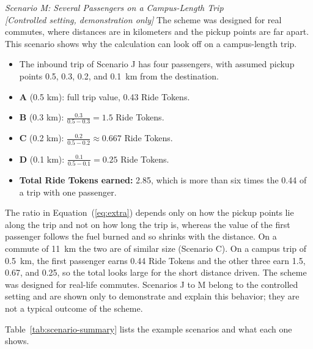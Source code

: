 \vspace{1em}
\noindent\textit{Scenario M: Several Passengers on a Campus-Length Trip}\\\textit{[Controlled setting, demonstration only]}
The scheme was designed for real commutes, where distances are in kilometers and the pickup points are far apart. This scenario shows why the calculation can look off on a campus-length trip.
\begin{itemize}
    \item The inbound trip of Scenario J has four passengers, with assumed pickup points 0.5, 0.3, 0.2, and 0.1~km from the destination.
    \item \textbf{A} (0.5 km): full trip value, 0.43 Ride Tokens.
    \item \textbf{B} (0.3 km): $\frac{0.3}{0.5-0.3} = 1.5$ Ride Tokens.
    \item \textbf{C} (0.2 km): $\frac{0.2}{0.5-0.2} \approx 0.667$ Ride Tokens.
    \item \textbf{D} (0.1 km): $\frac{0.1}{0.5-0.1} = 0.25$ Ride Tokens.
    \item \textbf{Total Ride Tokens earned:} 2.85, which is more than six times the 0.44 of a trip with one passenger.
\end{itemize}
The ratio in Equation~(\ref{eq:extra}) depends only on how the pickup points lie along the trip and not on how long the trip is, whereas the value of the first passenger follows the fuel burned and so shrinks with the distance. On a commute of 11~km the two are of similar size (Scenario C). On a campus trip of 0.5~km, the first passenger earns 0.44 Ride Tokens and the other three earn 1.5, 0.67, and 0.25, so the total looks large for the short distance driven. The scheme was designed for real-life commutes. Scenarios J to M belong to the controlled setting and are shown only to demonstrate and explain this behavior; they are not a typical outcome of the scheme.

\vspace{1em}
Table~\ref{tab:scenario-summary} lists the example scenarios and what each one shows.

